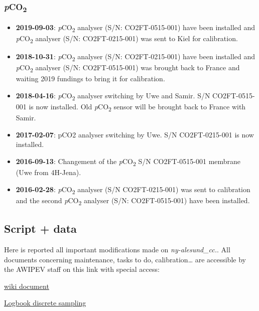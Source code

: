 \documentclass[
]{article}
\providecommand{\tightlist}{%
  \setlength{\itemsep}{0pt}\setlength{\parskip}{0pt}}
\begin{document}
\hypertarget{pco2-1}{%
\subsubsection{\texorpdfstring{\textbf{\emph{p}CO\textsubscript{2}}}{pCO2}}\label{pco2-1}}

\begin{itemize}
\tightlist
\item
  \textbf{2019-09-03}: \emph{p}CO\textsubscript{2} analyser (S/N:
  CO2FT-0515-001) have been installed and \emph{p}CO\textsubscript{2}
  analyser (S/N: CO2FT-0215-001) was sent to Kiel for calibration.
\item
  \textbf{2018-10-31}: \emph{p}CO\textsubscript{2} analyser (S/N:
  CO2FT-0215-001) have been installed and \emph{p}CO\textsubscript{2}
  analyser (S/N: CO2FT-0515-001) was brought back to France and waiting
  2019 fundings to bring it for calibration.
\item
  \textbf{2018-04-16}: \emph{p}CO\textsubscript{2} analyser switching by
  Uwe and Samir. S/N CO2FT-0515-001 is now installed. Old
  \emph{p}CO\textsubscript{2} sensor will be brought back to France with
  Samir.
\item
  \textbf{2017-02-07}: pCO2 analyser switching by Uwe. S/N
  CO2FT-0215-001 is now installed.
\item
  \textbf{2016-09-13}: Changement of the \emph{p}CO\textsubscript{2} S/N
  CO2FT-0515-001 membrane (Uwe from 4H-Jena).
\item
  \textbf{2016-02-28}: \emph{p}CO\textsubscript{2} analyser (S/N
  CO2FT-0215-001) was sent to calibration and the second
  \emph{p}CO\textsubscript{2} analyser (S/N: CO2FT-0515-001) have been
  installed.
\end{itemize}

\hypertarget{script-data}{%
\subsection{Script + data}\label{script-data}}

Here is reported all important modifications made on
\emph{ny-alesund\_cc.}. All documents concerning maintenance, tasks to
do, calibration\ldots{} are accessible by the AWIPEV staff on this link
with special access:

\href{https://spaces.awi.de}{wiki document}

\href{https://docs.google.com/spreadsheets/d/1bNh9q4bkNoh2ra78XC451EmGb9Q8kMf4ByBnKngeHOg/edit\#gid=1034421443}{Logbook
discrete sampling}
\end{document}
